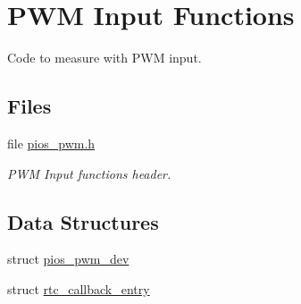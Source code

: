 \hypertarget{group___p_i_o_s___p_w_m}{\section{P\-W\-M Input Functions}
\label{group___p_i_o_s___p_w_m}
}


Code to measure with P\-W\-M input.  


\subsection*{Files}
\begin{DoxyCompactItemize}
\item 
file \hyperlink{pios__pwm_8h}{pios\-\_\-pwm.\-h}
\begin{DoxyCompactList}\small\item\em P\-W\-M Input functions header. \end{DoxyCompactList}\end{DoxyCompactItemize}
\subsection*{Data Structures}
\begin{DoxyCompactItemize}
\item 
struct \hyperlink{structpios__pwm__dev}{pios\-\_\-pwm\-\_\-dev}
\item 
struct \hyperlink{structrtc__callback__entry}{rtc\-\_\-callback\-\_\-entry}
\end{DoxyCompactItemize}
